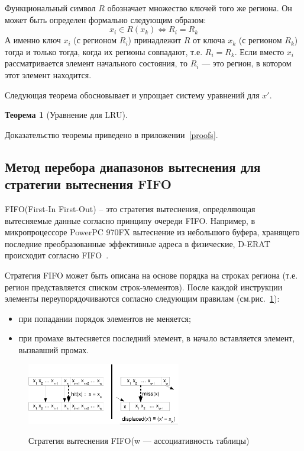 \documentclass[14pt]{extreport}
\newtheorem{theorem}{Теорема}
\newcommand{\LRU}{\textsf{LRU}\xspace}
\newcommand{\FIFO}{\textsf{FIFO}\xspace}
\begin{document}
Функциональный символ $R$ обозначает множество ключей того же региона. Он может
быть определен формально следующим образом:
$$x_i \in R(x_k) \Leftrightarrow R_i = R_k$$
А именно ключ $x_i$ (с регионом $R_i$) принадлежит $R$ от ключа $x_k$ (с
регионом $R_k$) тогда и только тогда, когда их регионы совпадают, т.е. $R_i =
R_k$. Если вместо $x_i$ рассматривается элемент начального состояния, то $R_i$
--- это регион, в котором этот элемент находится.

Следующая теорема обосновывает и упрощает систему уравнений для $x'$.
\begin{theorem}[Уравнение для \LRU]\label{LRU_equation} \DiapazonLRU
\end{theorem}

Доказательство теоремы приведено в приложении~\ref{proofs}.

\subsection{Метод перебора диапазонов вытеснения для стратегии
вытеснения \FIFO}

\FIFO (First-In First-Out) -- это стратегия вытеснения, определяющая
вытесняемые данные согласно принципу очереди FIFO. Например, в
микропроцессоре PowerPC 970FX вытеснение из небольшого буфера,
хранящего последние преобразованные эффективные адреса в физические,
D-ERAT происходит согласно \FIFO~\cite{PowerPC970FXUserManual}.

Стратегия \FIFO может быть описана на основе порядка на строках
региона (т.е. регион представляется списком строк-элементов). После каждой
инструкции элементы переупорядочиваются согласно следующим правилам
(см.рис.~\ref{fifo1}):
\begin{itemize}
\item при попадании порядок элементов не меняется;
\item при промахе вытесняется последний элемент, в начало вставляется элемент,
вызвавший промах.
\end{itemize}

\begin{figure}[h] \center
  \includegraphics[width=0.6\textwidth]{2.theor/fifo1}\\
  \caption{Стратегия вытеснения \FIFO (w --- ассоциативность
таблицы)}\label{fifo1}
\end{figure}
\end{document}
